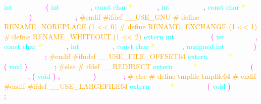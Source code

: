 \textcolor{cyan}{int} 
\textcolor{white}{renameat} 
\textcolor{magenta}{(} 
\textcolor{cyan}{int} 
\textcolor{white}{\_\_oldfd} 
\textcolor{magenta}{,} 
\textcolor{cyan}{const} 
\textcolor{cyan}{char} 
\textcolor{yellow}{*} 
\textcolor{white}{\_\_old} 
\textcolor{magenta}{,} 
\textcolor{cyan}{int} 
\textcolor{white}{\_\_newfd} 
\textcolor{magenta}{,} 
\textcolor{cyan}{const} 
\textcolor{cyan}{char} 
\textcolor{yellow}{*} 
\textcolor{white}{\_\_new} 
\textcolor{magenta}{)} 
\textcolor{white}{\_\_THROW} 
\textcolor{magenta}{;} 
\textcolor{orange}{\#endif} 
\textcolor{orange}{\#ifdef \_\_USE\_GNU} 
\textcolor{orange}{\# define RENAME\_NOREPLACE (1 << 0)} 
\textcolor{orange}{\# define RENAME\_EXCHANGE (1 << 1)} 
\textcolor{orange}{\# define RENAME\_WHITEOUT (1 << 2)} 
\textcolor{cyan}{extern} 
\textcolor{cyan}{int} 
\textcolor{white}{renameat2} 
\textcolor{magenta}{(} 
\textcolor{cyan}{int} 
\textcolor{white}{\_\_oldfd} 
\textcolor{magenta}{,} 
\textcolor{cyan}{const} 
\textcolor{cyan}{char} 
\textcolor{yellow}{*} 
\textcolor{white}{\_\_old} 
\textcolor{magenta}{,} 
\textcolor{cyan}{int} 
\textcolor{white}{\_\_newfd} 
\textcolor{magenta}{,} 
\textcolor{cyan}{const} 
\textcolor{cyan}{char} 
\textcolor{yellow}{*} 
\textcolor{white}{\_\_new} 
\textcolor{magenta}{,} 
\textcolor{cyan}{unsigned} 
\textcolor{cyan}{int} 
\textcolor{white}{\_\_flags} 
\textcolor{magenta}{)} 
\textcolor{white}{\_\_THROW} 
\textcolor{magenta}{;} 
\textcolor{orange}{\#endif} 
\textcolor{orange}{\#ifndef \_\_USE\_FILE\_OFFSET64} 
\textcolor{cyan}{extern} 
\textcolor{white}{FILE} 
\textcolor{yellow}{*} 
\textcolor{white}{tmpfile} 
\textcolor{magenta}{(} 
\textcolor{cyan}{void} 
\textcolor{magenta}{)} 
\textcolor{white}{\_\_wur} 
\textcolor{magenta}{;} 
\textcolor{orange}{\#else} 
\textcolor{orange}{\# ifdef \_\_REDIRECT} 
\textcolor{cyan}{extern} 
\textcolor{white}{FILE} 
\textcolor{yellow}{*} 
\textcolor{white}{\_\_REDIRECT} 
\textcolor{magenta}{(} 
\textcolor{white}{tmpfile} 
\textcolor{magenta}{,} 
\textcolor{magenta}{(} 
\textcolor{cyan}{void} 
\textcolor{magenta}{)} 
\textcolor{magenta}{,} 
\textcolor{white}{tmpfile64} 
\textcolor{magenta}{)} 
\textcolor{white}{\_\_wur} 
\textcolor{magenta}{;} 
\textcolor{orange}{\# else} 
\textcolor{orange}{\# define tmpfile tmpfile64} 
\textcolor{orange}{\# endif} 
\textcolor{orange}{\#endif} 
\textcolor{orange}{\#ifdef \_\_USE\_LARGEFILE64} 
\textcolor{cyan}{extern} 
\textcolor{white}{FILE} 
\textcolor{yellow}{*} 
\textcolor{white}{tmpfile64} 
\textcolor{magenta}{(} 
\textcolor{cyan}{void} 
\textcolor{magenta}{)} 
\textcolor{white}{\_\_wur} 
\textcolor{magenta}{;} 
